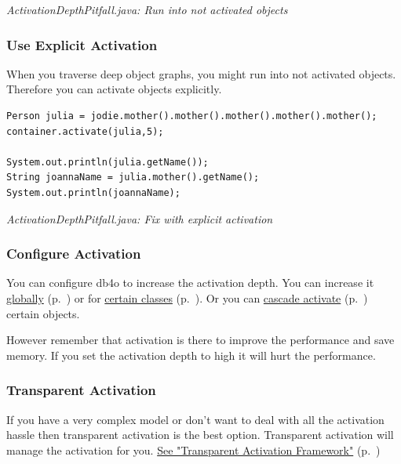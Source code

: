 {\small\itshape ActivationDepthPitfall.java: Run into not activated objects\par}
\medskip

\subsubsection*{Use Explicit Activation}

When you traverse deep object graphs, you might run into not activated objects. Therefore you can activate objects explicitly.

\begin{lstlisting}
Person julia = jodie.mother().mother().mother().mother().mother();
container.activate(julia,5);

System.out.println(julia.getName());
String joannaName = julia.mother().getName();
System.out.println(joannaName);
\end{lstlisting}

{\small\itshape ActivationDepthPitfall.java: Fix with explicit activation\par}
\medskip

\subsubsection*{Configure Activation}

You can configure db4o to increase the activation depth. You can increase it \hyperref[ref:configuration-common-activation-depth]{globally} (p.~\pageref{ref:configuration-common-activation-depth}) or for \hyperref[ref:configuration-objectclass-minimum-activation-depth]{certain classes} (p.~\pageref{ref:configuration-objectclass-minimum-activation-depth}). Or you can \hyperref[ref:configuration-objectclass-cascade-on-activate]{cascade activate} (p.~\pageref{ref:configuration-objectclass-cascade-on-activate}) certain objects.

However remember that activation is there to improve the performance and save memory. If you set the activation depth to high it will hurt the performance.

\subsubsection*{Transparent Activation}

If you have a very complex model or don't want to deal with all the activation hassle then transparent activation is the best option. Transparent activation will manage the activation for you. \hyperref[ref:basics-activation-concept-transparent-activation-framework]{See "Transparent Activation Framework"} (p.~\pageref{ref:basics-activation-concept-transparent-activation-framework})

